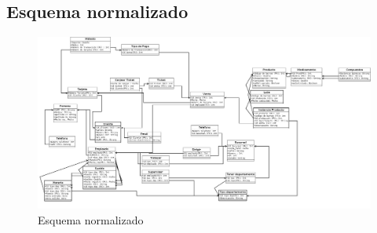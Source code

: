 \documentclass[10pt]{article}
\begin{document}
	\subsection{Esquema normalizado}
	\begin{figure}[H]
		\centering
		\includegraphics[scale=0.2]{practica07Norm.jpeg}
		\caption{Esquema normalizado}
		\label{fg:en}
	\end{figure}
	
\end{document}
